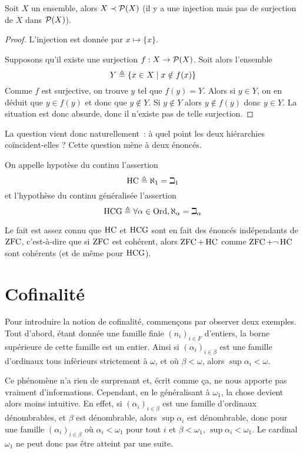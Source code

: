 \begin{theorem}[Cantor]
  Soit $X$ un ensemble, alors $X \prec \mathcal{P}(X)$ (il y a une injection mais
  pas de surjection de $X$ dans $\mathcal{P}(X)$).
\end{theorem}

\begin{proof}
  L'injection est donnée par $x \mapsto \{x\}$.

  Supposons qu'il existe une surjection $f : X \to \mathcal{P}(X)$. Soit alors
  l'ensemble
  \[Y\triangleq \{x\in X\mid x\notin f(x)\}\]
  Comme $f$ est surjective, on trouve $y$ tel que $f(y) = Y$. Alors si
  $y\in Y$, on en déduit que $y\in f(y)$ et donc que $y\notin Y$. Si
  $y\notin Y$ alors $y\notin f(y)$ donc $y\in Y$. La situation est donc absurde,
  donc il n'existe pas de telle surjection.
\end{proof}

La question vient donc naturellement~: à quel point les deux hiérarchies
coïncident-elles ? Cette question mène à deux énoncés.

\begin{definition}
  On appelle hypotèse du continu l'assertion
  \[\operatorname{HC} \triangleq \aleph_1 = \beth_1\]
  et l'hypothèse du continu généralisée l'assertion
  \[\operatorname{HCG} \triangleq \forall \alpha \in \operatorname{Ord}, \aleph_\alpha = \beth_\alpha\]
\end{definition}

Le fait est assez connu que $\operatorname{HC}$ et $\operatorname{HCG}$ sont en fait des énoncés
indépendants de $\operatorname{ZFC}$, c'est-à-dire que si $\operatorname{ZFC}$ est cohérent, alors
$\operatorname{ZFC} + \operatorname{HC}$ comme $\operatorname{ZFC} + \lnot\operatorname{HC}$ sont cohérents (et de même pour $\operatorname{HCG}$).

\section{Cofinalité}\label{sct.cof}

Pour introduire la notion de cofinalité, commençons par observer deux exemples.
Tout d'abord, étant donnée une famille finie $(n_i)_{i\in F}$ d'entiers, la borne
supérieure de cette famille est un entier. Ainsi si $(\alpha_i)_{i\in \beta}$ est
une famille d'ordinaux tous inférieurs strictement à $\omega$, et où
$\beta < \omega$, alors $\sup \alpha_i < \omega$.

Ce phénomène n'a rien de surprenant et, écrit comme ça, ne nous apporte pas
vraiment d'informations. Cependant, en le généralisant à $\omega_1$, la chose
devient alors moins intuitive. En effet, si $(\alpha_i)_{i\in \beta}$ est une
famille d'ordinaux dénombrables, et $\beta$ est dénombrable, alors
$\sup \alpha_i$ est dénombrable, donc pour une famille
$(\alpha_i)_{i\in \beta}$ où $\alpha_i < \omega_1$ pour tout $i$ et
$\beta < \omega_1$, $\sup \alpha_i < \omega_1$. Le cardinal $\omega_1$ ne peut
donc pas être atteint par une suite.

